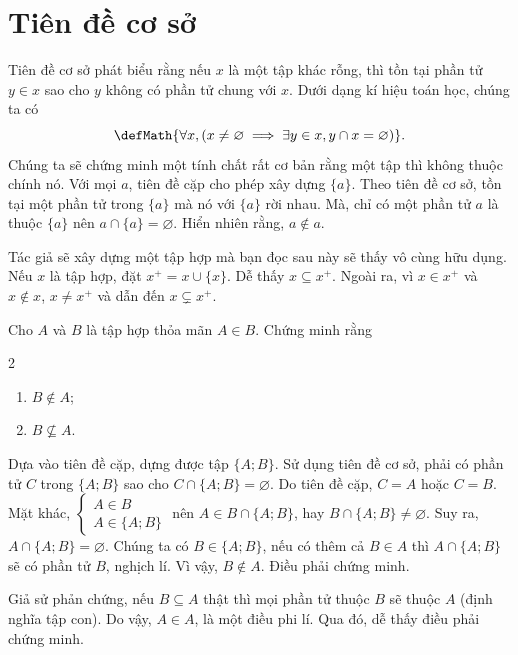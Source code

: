\section{Tiên đề cơ sở}

Tiên đề cơ sở phát biểu rằng nếu $x$ là một tập khác rỗng, thì tồn tại phần tử $y \in x$ sao cho $y$ không có phần tử chung với $x$. Dưới dạng kí hiệu toán học, chúng ta có 
\begin{equation*}
   \defMath{\forall x, \left(x \neq \varnothing \implies \exists y \in x, y \cap x = \varnothing\right)}.
\end{equation*}
Chúng ta sẽ chứng minh một tính chất rất cơ bản rằng một tập thì không thuộc chính nó. Với mọi $a$, tiên đề cặp cho phép xây dựng $\{a\}$. Theo tiên đề cơ sở, tồn tại một phần tử trong $\{a\}$ mà nó với $\{a\}$ rời nhau. Mà, chỉ có một phần tử $a$ là thuộc $\{a\}$ nên $a \cap \{a\} = \varnothing$. Hiển nhiên rằng, $a \notin a$.

Tác giả sẽ xây dựng một tập hợp mà bạn đọc sau này sẽ thấy vô cùng hữu dụng. Nếu $x$ là tập hợp, đặt $x^+ = x \cup \{x\}$. Dễ thấy $x \subseteq x^+$. Ngoài ra, vì $x \in x^+$ và $x \notin x$, $x \neq x^+$ và dẫn đến $x \subsetneq x^+$.

\exercise Cho $A$ và $B$ là tập hợp thỏa mãn $A \in B$. Chứng minh rằng 
\begin{multicols}{2}
   \begin{enumerate}
      \item $B \notin A$;
      \item $B \nsubseteq A$. 
   \end{enumerate}   
\end{multicols}

\solution

\resetSubexercise Dựa vào tiên đề cặp, dựng được tập $\{A; B\}$. Sử dụng tiên đề cơ sở, phải có phần tử $C$ trong $\{A; B\}$ sao cho $C \cap \{A; B\} = \varnothing$. Do tiên đề cặp, $C = A$ hoặc $C = B$. Mặt khác, $\begin{cases}
   A \in B \\
   A \in \{A; B\}
\end{cases}$ nên $A \in B \cap \{A; B\}$, hay $B \cap \{A; B\} \neq \varnothing$. Suy ra, $A \cap \{A; B\} = \varnothing$. Chúng ta có $B \in \{A; B\}$, nếu có thêm cả $B \in A$ thì $A \cap \{A; B\}$ sẽ có phần tử $B$, nghịch lí. Vì vậy, $B \notin A$. Điều phải chứng minh.

\stepSubexercise Giả sử phản chứng, nếu $B \subseteq A$ thật thì mọi phần tử thuộc $B$ sẽ thuộc $A$ (định nghĩa tập con). Do vậy, $A \in A$, là một điều phi lí. Qua đó, dễ thấy điều phải chứng minh.

